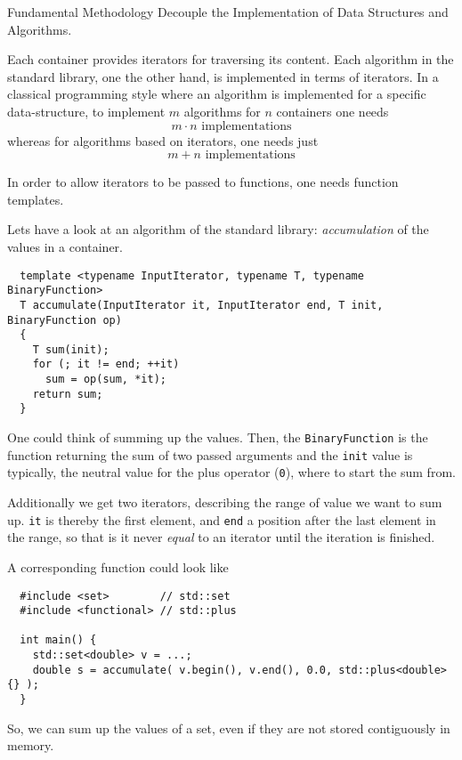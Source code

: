 \begin{guideline}{Fundamental Methodology}
  Decouple the Implementation of Data Structures and Algorithms.
\end{guideline}

Each container provides iterators for traversing its content. Each algorithm in the standard library, one the other hand, is implemented in terms
of iterators. In a classical programming style where an algorithm is implemented for a specific data-structure, to implement $m$ algorithms for
$n$ containers one needs
\[
  m\cdot n\text{ implementations}
\]
whereas for algorithms based on iterators, one needs just
\[
  m+n\text{ implementations}
\]

In order to allow iterators to be passed to functions, one needs function templates.

\begin{example}
  Lets have a look at an algorithm of the standard library: \emph{accumulation} of the values in a container.
  \begin{verbatim}
  template <typename InputIterator, typename T, typename BinaryFunction>
  T accumulate(InputIterator it, InputIterator end, T init, BinaryFunction op)
  {
    T sum(init);
    for (; it != end; ++it)
      sum = op(sum, *it);
    return sum;
  }
  \end{verbatim}

  One could think of summing up the values. Then, the \texttt{BinaryFunction} is the function returning
  the sum of two passed arguments and the \texttt{init} value is typically, the neutral value for the plus
  operator (\texttt{0}), \ie where to start the sum from.

  Additionally we get two iterators, describing the range of value we want to sum up. \texttt{it} is thereby the
  first element, and \texttt{end} a position after the last element in the range, so that is it never \textit{equal}
  to an iterator until the iteration is finished.

  A corresponding  function could look like
  \begin{verbatim}
  #include <set>        // std::set
  #include <functional> // std::plus

  int main() {
    std::set<double> v = ...;
    double s = accumulate( v.begin(), v.end(), 0.0, std::plus<double>{} );
  }
  \end{verbatim}
  So, we can sum up the values of a set, even if they are not stored contiguously in memory.
\end{example}


